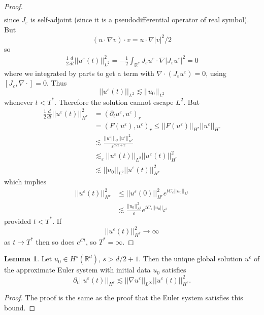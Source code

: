 \documentclass[12pt]{book}
\newcommand{\RR}{\mathbb{R}}
\theoremstyle{definition}
\newtheorem{lemma}[theorem]{Lemma}
\begin{document}
\begin{proof}
\begin{align*}
\end{align*}
since $J_\varepsilon$ is self-adjoint (since it is a pseudodifferential operator of real symbol). But
$$(u \cdot \nabla v) \cdot v = u \cdot \nabla |v|^2/2$$
so
\begin{align*}
\frac{1}{2} \frac{d}{dt} ||u^\varepsilon(t)||_{L^2}^2 = - \frac{1}{2}\int_{\RR^d} J_\varepsilon u^\varepsilon \cdot \nabla |J_\varepsilon u^\varepsilon|^2 = 0
\end{align*}
where we integrated by parts to get a term with $\nabla \cdot (J_\varepsilon u^\varepsilon) = 0$, using $[J_\varepsilon, \nabla \cdot] = 0$.
Thus
$$||u^\varepsilon(t)||_{L^2} \lesssim ||u_0||_{L^2}$$
whenever $t < T^*$.
Therefore the solution cannot escape $L^2$.
But
\begin{align*}
\frac{1}{2} \frac{d}{dt} ||u^\varepsilon(t)||_{H^r}^2 &= (\partial_t u^\varepsilon, u^\varepsilon)_r \\
&= (F(u^\varepsilon), u^\varepsilon)_r \leq ||F(u^\varepsilon)||_{H^r} ||u^\varepsilon||_{H^r}\\
&\lesssim \frac{||u^\varepsilon||_{L^2} ||u^\varepsilon||_{H^r}^2}{\varepsilon^{d/2+2}}\\
&\lesssim_\varepsilon ||u^\varepsilon(t)||_{L^2} ||u^\varepsilon(t)||_{H^r}^2\\
&\lesssim ||u_0||_{L^2} ||u^\varepsilon(t)||_{H^r}^2
\end{align*}
which implies
\begin{align*}
||u^\varepsilon(t)||_{H^r}^2 &\leq ||u^\varepsilon(0)||_{H^r}^2 e^{tC_\varepsilon ||u_0||_{L^2}}\\
&\lesssim \frac{||u_0||_{L^2}^2}{\varepsilon} e^{tC_\varepsilon ||u_0||_{L^2}}
\end{align*}
provided $t < T^*$.
If
$$||u^\varepsilon(t)||_{H^r}^2 \to \infty$$
as $t \to T^*$ then so does $e^{Ct}$, so $T^* = \infty$.
\end{proof}

\begin{lemma}
Let $u_0 \in H^s(\RR^d)$, $s > d/2 + 1$. Then the unique global solution $u^\varepsilon$ of the approximate Euler system with initial data $u_0$ satisfies
$$\partial_t ||u^\varepsilon(t)||_{H^r} \lesssim ||\nabla u^\varepsilon||_{L^\infty} ||u^\varepsilon(t)||_{H^r}^2.$$
\end{lemma}
\begin{proof}
The proof is the same as the proof that the Euler system satisfies this bound.
\end{proof}
\end{document}
